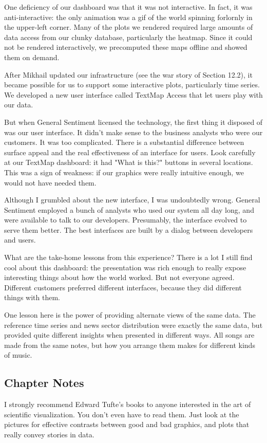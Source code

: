 \documentclass[10pt]{article}
\begin{document}
One deficiency of our dashboard was that it was not interactive. In fact, it was anti-interactive: the only animation was a gif of the world spinning forlornly in the upper-left corner. Many of the plots we rendered required large amounts of data access from our clunky database, particularly the heatmap. Since it could not be rendered interactively, we precomputed these maps offline and showed them on demand.

After Mikhail updated our infrastructure (see the war story of Section 12.2), it became possible for us to support some interactive plots, particularly time series. We developed a new user interface called TextMap Access that let users play with our data.

But when General Sentiment licensed the technology, the first thing it disposed of was our user interface. It didn't make sense to the business analysts who were our customers. It was too complicated. There is a substantial difference between surface appeal and the real effectiveness of an interface for users. Look carefully at our TextMap dashboard: it had "What is this?" buttons in several locations. This was a sign of weakness: if our graphics were really intuitive enough, we would not have needed them.

Although I grumbled about the new interface, I was undoubtedly wrong. General Sentiment employed a bunch of analysts who used our system all day long, and were available to talk to our developers. Presumably, the interface evolved to serve them better. The best interfaces are built by a dialog between developers and users.

What are the take-home lessons from this experience? There is a lot I still find cool about this dashboard: the presentation was rich enough to really expose interesting things about how the world worked. But not everyone agreed. Different customers preferred different interfaces, because they did different things with them.

One lesson here is the power of providing alternate views of the same data. The reference time series and news sector distribution were exactly the same data, but provided quite different insights when presented in different ways. All songs are made from the same notes, but how you arrange them makes for different kinds of music.

\subsection{Chapter Notes}
I strongly recommend Edward Tufte's books \citep{Tuf83, Tuf90, Tuf97} to anyone interested in the art of scientific visualization. You don't even have to read them. Just look at the pictures for effective contrasts between good and bad graphics, and plots that really convey stories in data.
\end{document}
